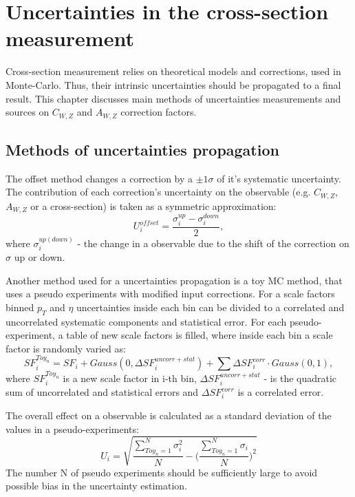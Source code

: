 \chapter{Uncertainties in the cross-section measurement}\label{chap:Unc}
\minitoc
Cross-section measurement relies on theoretical models and corrections, used in Monte-Carlo. Thus, their intrinsic uncertainties should be propagated to a final result. This chapter discusses main methods of uncertainties measurements and sources on $C_{W,Z}$ and $A_{W,Z}$ correction factors. 

\section{Methods of uncertainties propagation}
The offset method changes a correction by a $\pm 1\sigma$ of it's systematic uncertainty. The contribution of each correction's uncertainty on the observable (e.g. $C_{W,Z}$, $A_{W,Z}$ or a cross-section) is taken as a symmetric approximation:
\begin{equation}
U_i^{offset}=\frac{\sigma_{i}^{up}-\sigma_{i}^{down}}{2},
\end{equation}
where $\sigma_{i}^{up(down)}$ - the change in a observable due to the shift of the correction on $\sigma$ up or down. 

Another method used for a uncertainties propagation is a toy MC method, that uses a pseudo experiments with modified input corrections. For a scale factors binned $p_T$ and $\eta$ uncertainties inside each bin can be divided to a correlated  and uncorrelated systematic components and statistical error. For each pseudo-experiment, a table of new scale factors is filled, where inside each bin a scale factor is randomly varied as:
\begin{equation}\label{eq:ToyMethod}
SF_{i}^{Toy_{n}} = SF_{i}+ Gauss(0,\Delta SF_{i} ^{uncorr+stat}) + \sum \Delta SF_{i} ^{corr} \cdot Gauss(0, 1),
\end{equation}
where $SF_{i}^{Toy_{n}}$ is a new scale factor in i-th bin, $\Delta SF_{i} ^{uncorr+stat}$ - is the quadratic sum of uncorrelated and statistical errors and $\Delta SF_{i} ^{corr}$ is a correlated error.

The overall effect on a observable is calculated as a standard deviation of the values in a pseudo-experiments:
\begin{equation}\label{eq:ToyError}
U_{i}=\sqrt{\frac{\sum_{Toy_n=1}^{N} \sigma^2_{i}} {N} - \Bigg(\frac{\sum_{Toy_n=1}^{N} \sigma_{i}} {N}\Bigg)^2}
\end{equation}
The number N of pseudo experiments should be sufficiently large to avoid possible bias in the uncertainty estimation.
 
